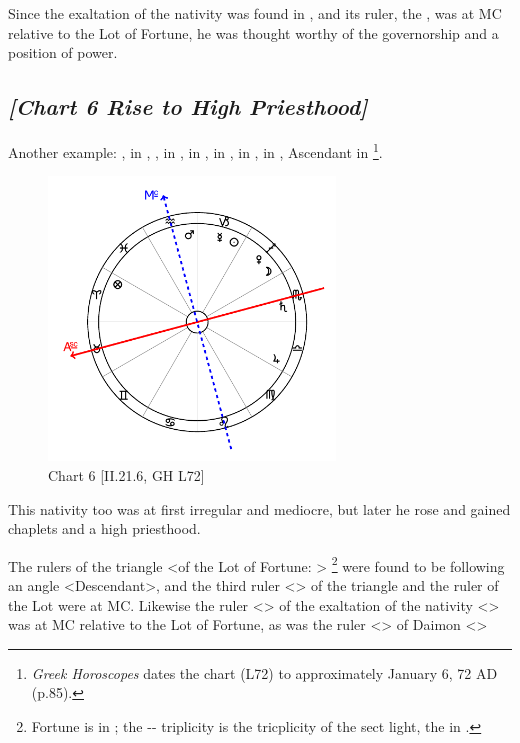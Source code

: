 Since the exaltation of the nativity was found in \Leo, and its ruler, the \Sun, was at MC relative to the Lot of Fortune, he was thought worthy of the governorship and a position of power.
\newpage

\subsection*{\textit{[Chart 6 Rise to High Priesthood]}}

Another example: \Sun, \Mercury\xspace in \Capricorn, \Moon, \Venus\xspace in \Sagittarius, \Saturn\xspace in \Scorpio,
\Jupiter\xspace in \Libra, \Mars\xspace in \Aquarius, \Fortune \xspace in \Aries, Ascendant in \Taurus
\footnote{\textit{Greek Horoscopes} dates the chart (L72) to approximately January 6, 72 AD (p.85).}.

\clearpage
\begin{figure}
\centering
\vspace{-20pt}
\includegraphics[width=0.68\textwidth]{charts/2_21_6}
\caption{Chart 6 [II.21.6, GH L72]}
\label{fig:chart06}
\end{figure}

This nativity too was at first irregular and mediocre, but later he rose and gained chaplets and a high priesthood. 

The rulers of the triangle <of the Lot of Fortune: \Taurus\xspace \Virgo\xspace \Capricorn>
\footnote{Fortune is in \Aries; the \Taurus-\Virgo-\Capricorn\xspace triplicity is the tricplicity of the sect light, the \Sun\xspace in \Capricorn\xspace.}  were found to be following an angle <Descendant>, and the third ruler <\Mars> of the triangle and the ruler of the Lot were at MC. Likewise the ruler <\Sun> of the exaltation of the nativity <\Leo> was at MC relative to the Lot of Fortune, as was the ruler <\Mercury> of Daimon <\Gemini>


